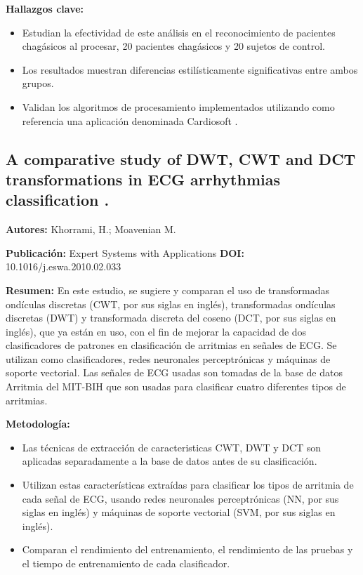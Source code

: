 \documentclass[spanish,11pt,letterpaper,oneside]{memoir}
\begin{document}
\textbf{Hallazgos clave:}
\begin{itemize}
	\item Estudian la efectividad de este análisis en el reconocimiento de pacientes chagásicos al procesar, 20 pacientes chagásicos y 20 sujetos de control.
	\item Los resultados muestran diferencias estilísticamente significativas entre ambos grupos.
	\item Validan los algoritmos de procesamiento implementados utilizando como referencia una aplicación denominada Cardiosoft \cite{cardiosoft}.
\end{itemize}

\subsection{A comparative study of DWT, CWT and DCT transformations in ECG arrhythmias classification \cite{Khorrami10}.}
\textbf{Autores:} Khorrami, H.; Moavenian M.
 
\textbf{Publicación:} Expert Systems with Applications
\textbf{DOI:} 10.1016/j.eswa.2010.02.033

\textbf{Resumen:} En este estudio, se sugiere y comparan el uso de transformadas ondículas discretas (CWT, por sus siglas en inglés), transformadas ondículas discretas (DWT) y transformada discreta del coseno (DCT, por sus siglas en inglés), que ya están en uso, con el fin de mejorar la capacidad de dos clasificadores de patrones en clasificación de arritmias en señales de ECG. Se utilizan como clasificadores, redes neuronales perceptrónicas y máquinas de soporte vectorial. Las señales de ECG usadas son tomadas de la base de datos Arritmia del MIT-BIH que son usadas para clasificar cuatro diferentes tipos de arritmias. 

\textbf{Metodología:}
\begin{itemize}
	\item Las técnicas de extracción de caracteristicas CWT, DWT y DCT son aplicadas separadamente a la base de datos antes de su clasificación.
	\item Utilizan estas características extraídas para clasificar los tipos de arritmia de cada señal de ECG, usando redes neuronales perceptrónicas (NN, por sus siglas en inglés) y máquinas de soporte vectorial (SVM, por sus siglas en inglés).
	\item Comparan el rendimiento del entrenamiento, el rendimiento de las pruebas y el tiempo de entrenamiento de cada clasificador. 
\end{itemize}
\end{document}
